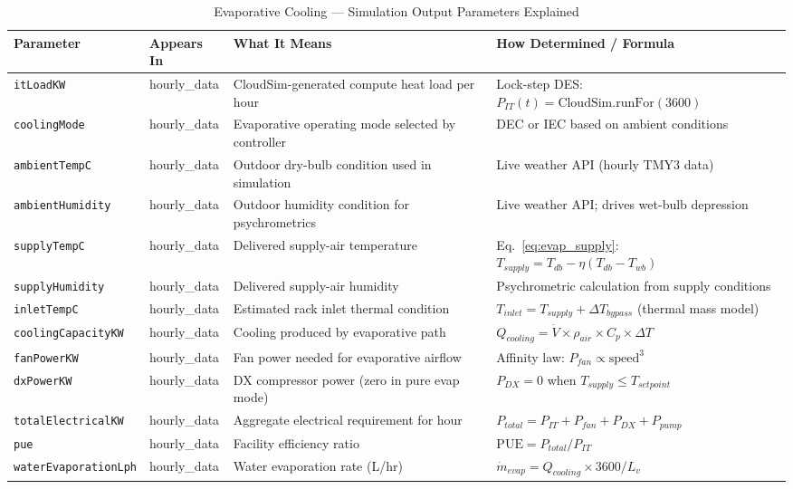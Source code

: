 \documentclass[12pt,a4paper]{report}
\begin{document}
\begin{table}[H]
\centering
\caption{Evaporative Cooling --- Simulation Output Parameters Explained}
\label{tab:evap_params}
\renewcommand{\arraystretch}{1.3}
\scriptsize
\begin{tabular}{p{3cm}p{2.5cm}p{4.5cm}p{4.5cm}}
\toprule
\textbf{Parameter} & \textbf{Appears In} & \textbf{What It Means} & \textbf{How Determined / Formula} \\
\midrule
\texttt{itLoadKW} & hourly\_data & CloudSim-generated compute heat load per hour & Lock-step DES: $P_{IT}(t) = \text{CloudSim.runFor}(3600)$ \\
\texttt{coolingMode} & hourly\_data & Evaporative operating mode selected by controller & DEC or IEC based on ambient conditions \\
\texttt{ambientTempC} & hourly\_data & Outdoor dry-bulb condition used in simulation & Live weather API (hourly TMY3 data) \\
\texttt{ambientHumidity} & hourly\_data & Outdoor humidity condition for psychrometrics & Live weather API; drives wet-bulb depression \\
\texttt{supplyTempC} & hourly\_data & Delivered supply-air temperature & Eq.~\ref{eq:evap_supply}: $T_{supply} = T_{db} - \eta(T_{db}-T_{wb})$ \\
\texttt{supplyHumidity} & hourly\_data & Delivered supply-air humidity & Psychrometric calculation from supply conditions \\
\texttt{inletTempC} & hourly\_data & Estimated rack inlet thermal condition & $T_{inlet} = T_{supply} + \Delta T_{bypass}$ (thermal mass model) \\
\texttt{coolingCapacityKW} & hourly\_data & Cooling produced by evaporative path & $Q_{cooling} = \dot{V} \times \rho_{air} \times C_p \times \Delta T$ \\
\texttt{fanPowerKW} & hourly\_data & Fan power needed for evaporative airflow & Affinity law: $P_{fan} \propto \text{speed}^3$ \\
\texttt{dxPowerKW} & hourly\_data & DX compressor power (zero in pure evap mode) & $P_{DX} = 0$ when $T_{supply} \leq T_{setpoint}$ \\
\texttt{totalElectricalKW} & hourly\_data & Aggregate electrical requirement for hour & $P_{total} = P_{IT} + P_{fan} + P_{DX} + P_{pump}$ \\
\texttt{pue} & hourly\_data & Facility efficiency ratio & $\text{PUE} = P_{total} / P_{IT}$ \\
\texttt{waterEvaporationLph} & hourly\_data & Water evaporation rate (L/hr) & $\dot{m}_{evap} = Q_{cooling} \times 3600 / L_v$ \\

\end{tabular}
\end{table}
\end{document}
